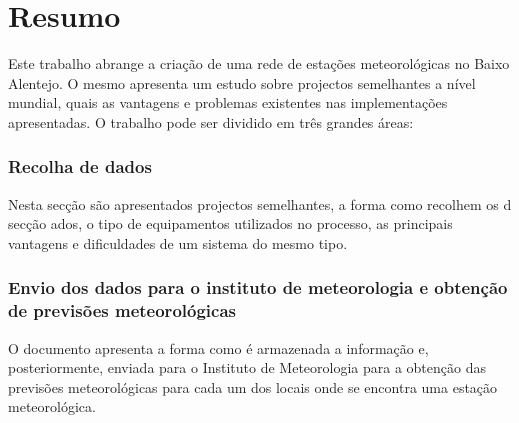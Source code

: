 \documentclass[11pt,a4paper,a4wide,headsepline,bibtotoc,twoside]{scrbook}
\begin{document}
\garamond
\graphicspath{{EPS/}}

\frontmatter

\thispagestyle{empty}
\cleardoublepage


\mainmatter


\cleardoublepage
\pagestyle{headings}
\setcounter{page}{1}
\tableofcontents
\cleardoublepage


\chapter{Resumo}
\label{chap:intro}
Este trabalho abrange a criação de uma rede de estações meteorológicas no Baixo Alentejo. O mesmo apresenta um estudo sobre projectos semelhantes a nível mundial, quais as vantagens e problemas existentes nas implementações apresentadas.
O trabalho pode ser dividido em três grandes áreas:
\subsection*{Recolha de dados}
\label{sec:recolha_dados}
Nesta secção são apresentados projectos semelhantes, a forma como recolhem os d secção ados, o tipo de equipamentos utilizados no processo, as principais vantagens e dificuldades de um sistema do mesmo tipo.
\subsection*{Envio dos dados para o instituto de meteorologia e obtenção de previsões meteorológicas}
O documento apresenta a forma como é armazenada a informação e, posteriormente, enviada para o Instituto de Meteorologia para a obtenção das previsões meteorológicas para cada um dos locais onde se encontra uma estação meteorológica.
\end{document}
